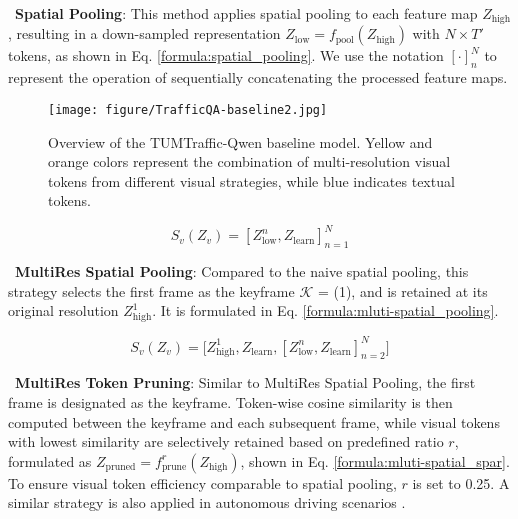 \noindent\textbullet\  \textbf{Spatial Pooling}: This method applies spatial pooling to each feature map $Z_{\text{high}}$, resulting in a down-sampled representation $Z_{\text{low}} = f_{\text{pool}}(Z_{\text{high}})$ with $N \times T'$ tokens, as shown in Eq. \ref{formula:spatial_pooling}. We use the notation $[ \cdot ]_{n}^{N}$ to represent the operation of sequentially concatenating the processed feature maps.



\begin{figure}[t!]
    \centering
    \texttt{[image: figure/TrafficQA-baseline2.jpg]}
    \caption{Overview of the TUMTraffic-Qwen baseline model. Yellow and orange colors represent the combination of multi-resolution visual tokens from different visual strategies, while blue indicates textual tokens.}
    \label{baseline_model}
\end{figure}

{\small
\begin{equation}
S_v(Z_v) =  [ Z_{\text{low}}^{n}, Z_{\text{learn}} ]_{n=1}^N 
\label{formula:spatial_pooling}
\end{equation}}


\noindent\textbullet\ \textbf{MultiRes Spatial Pooling}: Compared to the naive spatial pooling, this strategy selects the first frame as the keyframe $\mathcal{K}$ = (1), and is retained at its original resolution $Z_{\text{high}}^1$. It is formulated in Eq. \ref{formula:mluti-spatial_pooling}. 



{\small
\begin{equation}
S_v(Z_v) = [ Z_{\text{high}}^1, Z_{\text{learn}}, [ Z_{\text{low}}^{n}, Z_{\text{learn}} ]_{n=2}^N \big]
\label{formula:mluti-spatial_pooling}
\end{equation}}


\noindent\textbullet\  \textbf{MultiRes Token Pruning}: Similar to MultiRes Spatial Pooling, the first frame is designated as the keyframe. Token-wise cosine similarity is then computed between the keyframe and each subsequent frame, while visual tokens with lowest similarity are selectively retained based on predefined ratio $r$, formulated as $Z_{\text{pruned}} = f_{\text{prune}}^{r}(Z_{\text{high}} )$, shown in Eq. \ref{formula:mluti-spatial_spar}. To ensure visual token efficiency comparable to spatial pooling, $r$ is set to 0.25. A similar strategy is also applied in autonomous driving scenarios \cite{ma2024videotokensparsificationefficient}.


